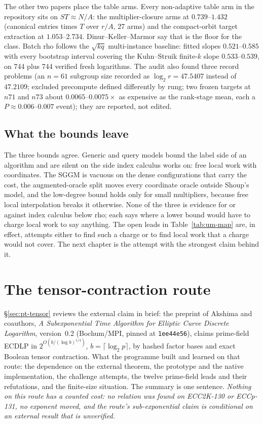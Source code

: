 The other two papers place the table arms. Every non-adaptive table arm in
the repository sits on $ST\approx N/A$: the multiplier-closure arms at
$0.739$--$1.432$ (canonical entries times $T$ over $r/A$, 27 arms) and the
compact-orbit target extraction at $1.053$--$2.734$. Dinur--Keller--Marmor
say that is the floor for the class. Batch rho follows the
$\sqrt{kq}$ multi-instance baseline: fitted slopes $0.521$--$0.585$ with
every bootstrap interval covering the Kuhn--Struik finite-$k$ slope
$0.533$--$0.539$, on 744 plus 744 verified fresh logarithms. The audit also
found three record problems (an $n=61$ subgroup size recorded as
$\log_2r=47.5407$ instead of $47.2109$; excluded precompute defined
differently by rung; two frozen targets at $n71$ and $n73$ about
$0.0065$--$0.0075\times$ as expensive as the rank-stage mean, each a
$P\approx0.006$--$0.007$ event); they are reported, not edited.

\section{What the bounds leave}\label{sec:um-reading}

The three bounds agree. Generic and query models bound the label side of
an algorithm and are silent on the side index calculus works on: free
local work with coordinates. The SGGM is vacuous on the dense
configurations that carry the cost, the augmented-oracle split moves every
coordinate oracle outside Shoup's model, and the low-degree bound holds
only for small multipliers, because free local interpolation breaks it
otherwise. None of the three is evidence for or against index calculus
below rho; each says where a lower bound would have to charge local work
to say anything. The open leads in Table~\ref{tab:um-map} are, in effect,
attempts either to find such a charge or to find local work that a charge
would not cover. The next chapter is the attempt with the strongest claim
behind it.


\chapter{The tensor-contraction route}\label{ch:tensor}

\S\ref{sec:pt-tensor} reviews the external claim in brief: the preprint of
Akshima and coauthors, \emph{A Subexponential Time Algorithm for Elliptic
Curve Discrete Logarithm}, version~0.2 (Bochum/MPI, pinned at
\texttt{1ee44e56}), claims prime-field ECDLP in
$2^{O(b/(\log b)^{1/4})}$, $b=\lceil\log_2p\rceil$, by hashed factor bases and
exact Boolean tensor contraction. What the programme built and learned on that route: the dependence on the
external theorem, the prototype and the native implementation, the
challenge attempts, the twelve prime-field leads and their refutations,
and the finite-size situation. The summary is one sentence. \emph{Nothing
on this route has a counted cost: no relation was found on ECC2K-130 or
ECCp-131, no exponent moved, and the route's sub-exponential claim is
conditional on an external result that is unverified.}

